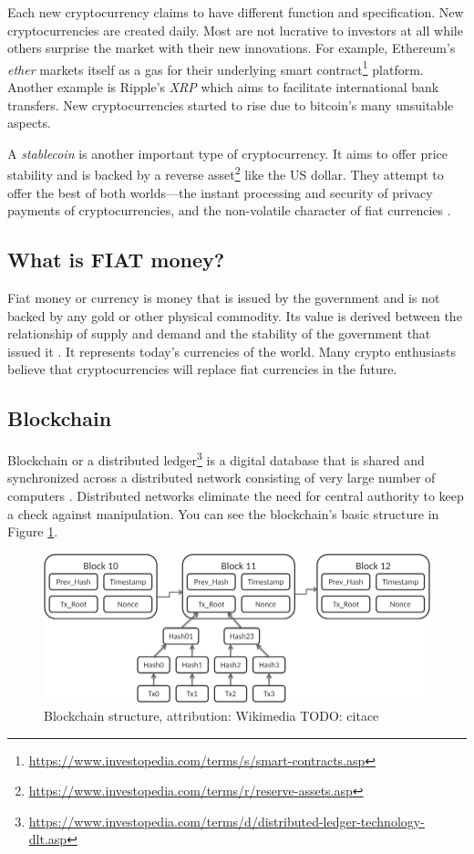 Each new cryptocurrency claims to have different function and specification. New cryptocurrencies are created daily. Most are not lucrative to investors at all while others surprise the market with their new innovations. For example, Ethereum's \emph{ether} markets itself as a gas for their underlying smart contract\footnote{\url{https://www.investopedia.com/terms/s/smart-contracts.asp}} platform. Another example is Ripple's \emph{XRP} which aims to facilitate international bank transfers. New cryptocurrencies started to rise due to bitcoin's many unsuitable aspects.

\label{stablecoins-ref}
A \emph{stablecoin} is another important type of cryptocurrency. It aims to offer price stability and is backed by a reverse asset\footnote{\url{https://www.investopedia.com/terms/r/reserve-assets.asp}} like the US dollar. They attempt to offer the best of both worlds---the instant processing and security of privacy payments of cryptocurrencies, and the non-volatile character of fiat currencies \cite{investopedia-stablecoin}.

\subsection*{What is FIAT money?}
﻿Fiat money or currency is money that is issued by the government and is not backed by any gold or other physical commodity. Its value is derived between the relationship of supply and demand and the stability of the government that issued it \cite{investopedia-fiat}. It represents today's currencies of the world. Many crypto enthusiasts believe that cryptocurrencies will replace fiat currencies in the future.

\subsection*{Blockchain}
\label{blockchain}
Blockchain or a distributed ledger\footnote{\url{https://www.investopedia.com/terms/d/distributed-ledger-technology-dlt.asp}} is a digital database that is shared and synchronized across a distributed network consisting of very large number of computers \cite{investopedia-blockchain}. Distributed networks eliminate the need for central authority to keep a check against manipulation. You can see the blockchain's basic structure in Figure \ref{blockchain-figure}.

\begin{figure}[ht]
    \centering
    \includegraphics[width=\columnwidth]{figures/Bitcoin_Block_Data.png}
    \caption{Blockchain structure, attribution: Wikimedia TODO: citace}
    \label{blockchain-figure}
\end{figure}

